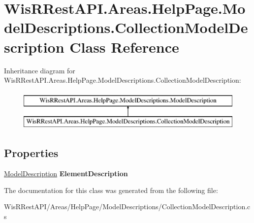\hypertarget{class_wis_r_rest_a_p_i_1_1_areas_1_1_help_page_1_1_model_descriptions_1_1_collection_model_description}{}\section{Wis\+R\+Rest\+A\+P\+I.\+Areas.\+Help\+Page.\+Model\+Descriptions.\+Collection\+Model\+Description Class Reference}
\label{class_wis_r_rest_a_p_i_1_1_areas_1_1_help_page_1_1_model_descriptions_1_1_collection_model_description}
Inheritance diagram for Wis\+R\+Rest\+A\+P\+I.\+Areas.\+Help\+Page.\+Model\+Descriptions.\+Collection\+Model\+Description\+:\begin{figure}[H]
\begin{center}
\leavevmode
\includegraphics[height=2.000000cm]{class_wis_r_rest_a_p_i_1_1_areas_1_1_help_page_1_1_model_descriptions_1_1_collection_model_description}
\end{center}
\end{figure}
\subsection*{Properties}
\begin{DoxyCompactItemize}
\item 
\hypertarget{class_wis_r_rest_a_p_i_1_1_areas_1_1_help_page_1_1_model_descriptions_1_1_collection_model_description_a48a1bca5f9231ab58cdc6ea68df99078}{}\hyperlink{class_wis_r_rest_a_p_i_1_1_areas_1_1_help_page_1_1_model_descriptions_1_1_model_description}{Model\+Description} {\bfseries Element\+Description}\label{class_wis_r_rest_a_p_i_1_1_areas_1_1_help_page_1_1_model_descriptions_1_1_collection_model_description_a48a1bca5f9231ab58cdc6ea68df99078}

\end{DoxyCompactItemize}


The documentation for this class was generated from the following file\+:\begin{DoxyCompactItemize}
\item 
Wis\+R\+Rest\+A\+P\+I/\+Areas/\+Help\+Page/\+Model\+Descriptions/Collection\+Model\+Description.\+cs\end{DoxyCompactItemize}
